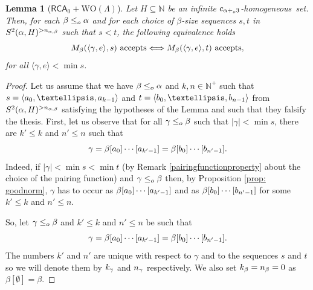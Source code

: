 \documentclass[10pt,a4paper]{amsart}
\newtheorem{lemma}{Lemma}
\newcommand{\N}{\numberset{N}}
\newcommand{\RCA}{\mathsf{RCA}_0}
\def\WO{{\textrm{WO}}}
\def\a{\alpha}
\def\b{\beta}
\newcommand{\homo}{homogeneous}
\def\ifff{\Longleftrightarrow}
\newcommand{\leqo}{\leq\sb{o}}
\newcommand{\lorenzo}[1]{\textcolor{blue}{#1}}
\newcommand{\numberset}{\mathbb}
\newcommand{\pluso}{+\sb{o}}
\begin{document}
\begin{lemma}[$\RCA+\WO(\Lambda)$]\label{lem:lem:eq:homo:wit}
Let $H\subseteq\N$ be an infinite $c\sb{\alpha \pluso3}$-\homo\ set. 
Then, for each $\beta\leqo \alpha$ and for each choice of $\beta$-size sequences $s,t$ in $S\sp2(\alpha,H)\sp{>n_{\a,\b}}$ such that $s < t$, the following equivalence holds
$$
M\sb\beta(\langle \gamma,e\rangle,s)\mbox{ accepts} \ifff
M\sb\beta(\langle \gamma,e\rangle,t)\mbox{ accepts},
$$
for all $\langle \gamma,e\rangle<\min s$.
\end{lemma}

\begin{proof}
Let us assume that we have $\beta\leqo\alpha$
and $k, n \in \N^+$ such that $s=\langle a\sb0,\dots,a\sb {k-1}\rangle$ and  $t=\langle b\sb0,\dots, b\sb {n-1}\rangle$ from $S\sp2(\alpha,H)\sp{>n_{\a,\b}}$ satisfying the hypotheses of the Lemma and such that they falsify the thesis.
First, let us observe that for all $\gamma\leqo \beta$ such that $|\gamma | < \min s$, there are $k'\leq k$ and $n'\leq n$ such that 
$$
\gamma=\beta[a\sb0]\cdots [a\sb{k'-1}]=\beta[b\sb0]\cdots[b\sb{n'-1}].
$$
Indeed, if $|\gamma| < \min s < \min t$ (by Remark \ref{pairingfunctionproperty} about the choice of the pairing function) and $\gamma\leqo \beta$ then, by Proposition \ref{prop: goodnorm}, $\gamma$ has to occur as $\beta[a\sb0]\cdots [a\sb{k'-1}]$ and as $\beta[b\sb0]\cdots [b\sb{n'-1}]$ for some $k'\leq k$ and $n'\leq n$. 

So, let $\gamma\leqo\beta$ and $k'\leq k$ and $n' \leq n$ be such that 
$$
\gamma=\beta[a\sb0]\cdots [a\sb{k'-1}]=\beta[b\sb0]\cdots [b\sb{n'-1}].
$$
The numbers $k'$ and $n'$ are unique with respect to $\gamma$ and to the sequences $s$ and $t$ so we will denote them by $k\sb\gamma$ and $n\sb\gamma$ respectively. 
We also set $k\sb\beta=n\sb\beta=0$ as $\beta[\emptyset]=\beta$. 



\end{proof}
\end{document}
